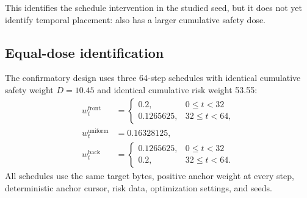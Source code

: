 This identifies the schedule intervention in the studied seed, but it does not yet identify temporal placement: \constanttwenty{} also has a larger cumulative safety dose.

\subsection{Equal-dose identification}

The confirmatory design uses three 64-step schedules with identical cumulative safety weight $D=10.45$ and identical cumulative risk weight 53.55:
\begin{align}
  w_t^{\mathrm{front}} &= \begin{cases}0.2,&0\le t<32\\0.1265625,&32\le t<64,\end{cases}\\
  w_t^{\mathrm{uniform}} &= 0.16328125,\\
  w_t^{\mathrm{back}} &= \begin{cases}0.1265625,&0\le t<32\\0.2,&32\le t<64.\end{cases}
\end{align}
All schedules use the same target bytes, positive anchor weight at every step, deterministic anchor cursor, risk data, optimization settings, and seeds.


